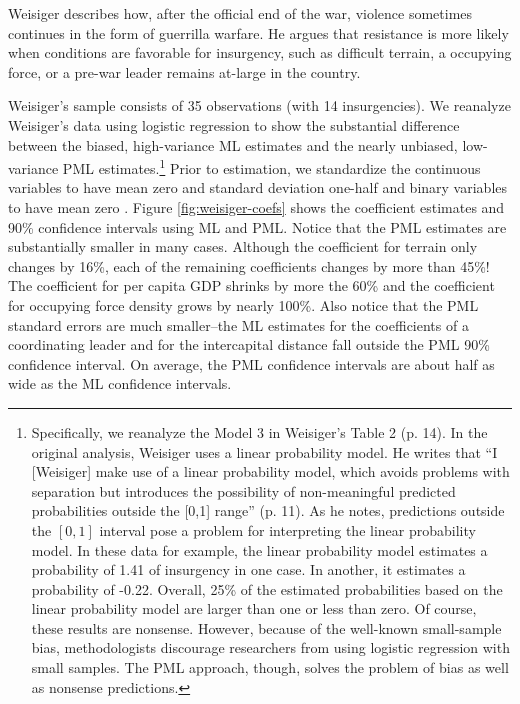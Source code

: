 \documentclass[12pt]{article}
\begin{document}
Weisiger describes how, after the official end of the war, violence sometimes continues in the form of guerrilla warfare.
He argues that resistance is more likely when conditions are favorable for insurgency, such as difficult terrain, a occupying force, or a pre-war leader remains at-large in the country.

Weisiger's sample consists of 35 observations (with 14 insurgencies).
We reanalyze Weisiger's data using logistic regression to show the substantial difference between the biased, high-variance ML estimates and the nearly unbiased, low-variance PML estimates.\footnote{Specifically, we reanalyze the Model 3 in Weisiger's Table 2 (p. 14).
In the original analysis, Weisiger uses a linear probability model.
He writes that ``I [Weisiger] make use of a linear probability model, which avoids problems with separation but introduces the possibility of non-meaningful predicted probabilities outside the [0,1] range'' (p. 11).
As he notes, predictions outside the $[0, 1]$ interval pose a problem for interpreting the linear probability model.
In these data for example, the linear probability model estimates a probability of 1.41 of insurgency in one case.
In another, it estimates a probability of -0.22.
Overall, 25\% of the estimated probabilities based on the linear probability model are larger than one or less than zero.
Of course, these results are nonsense.
However, because of the well-known small-sample bias, methodologists discourage researchers from using logistic regression with small samples.
The PML approach, though, solves the problem of bias as well as nonsense predictions.} Prior to estimation, we standardize the continuous variables to have mean zero and standard deviation one-half and binary variables to have mean zero \citep{Gelman2008}.
Figure \ref{fig:weisiger-coefs} shows the coefficient estimates and 90\% confidence intervals using ML and PML.
Notice that the PML estimates are substantially smaller in many cases.
Although the coefficient for terrain only changes by 16\%, each of the remaining coefficients changes by more than 45\%!
The coefficient for per capita GDP shrinks by more the 60\% and the coefficient for occupying force density grows by nearly 100\%.
Also notice that the PML standard errors are much smaller--the ML estimates for the coefficients of a coordinating leader and for the intercapital distance fall outside the PML 90\% confidence interval.
On average, the PML confidence intervals are about half as wide as the ML confidence intervals.
\end{document}
